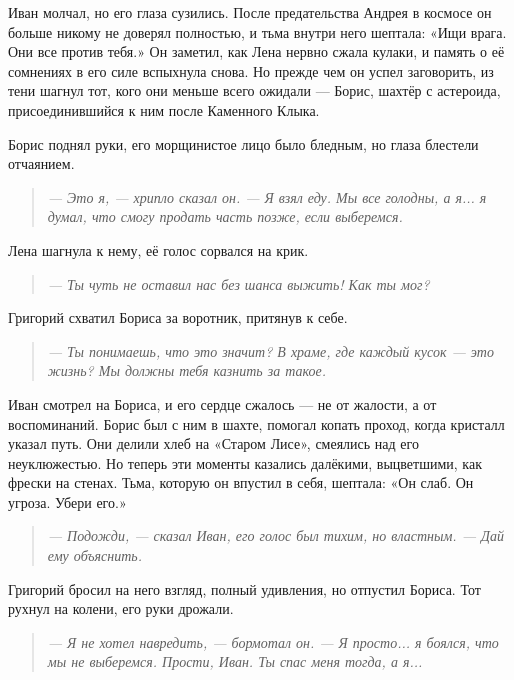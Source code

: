 \documentclass[12pt,a4paper]{book} %
\newenvironment{dialogue}{\begin{quote}\itshape}{\end{quote}}
\begin{document}
Иван молчал, но его глаза сузились. После предательства Андрея в космосе он больше никому не доверял полностью, и тьма внутри него шептала: «Ищи врага. Они все против тебя.» Он заметил, как Лена нервно сжала кулаки, и память о её сомнениях в его силе вспыхнула снова. Но прежде чем он успел заговорить, из тени шагнул тот, кого они меньше всего ожидали --- Борис, шахтёр с астероида, присоединившийся к ним после Каменного Клыка.

Борис поднял руки, его морщинистое лицо было бледным, но глаза блестели отчаянием.

\begin{dialogue}
--- Это я, --- хрипло сказал он. --- Я взял еду. Мы все голодны, а я... я думал, что смогу продать часть позже, если выберемся.
\end{dialogue}

Лена шагнула к нему, её голос сорвался на крик.

\begin{dialogue}
--- Ты чуть не оставил нас без шанса выжить! Как ты мог?
\end{dialogue}

Григорий схватил Бориса за воротник, притянув к себе.

\begin{dialogue}
--- Ты понимаешь, что это значит? В храме, где каждый кусок --- это жизнь? Мы должны тебя казнить за такое.
\end{dialogue}

Иван смотрел на Бориса, и его сердце сжалось --- не от жалости, а от воспоминаний. Борис был с ним в шахте, помогал копать проход, когда кристалл указал путь. Они делили хлеб на «Старом Лисе», смеялись над его неуклюжестью. Но теперь эти моменты казались далёкими, выцветшими, как фрески на стенах. Тьма, которую он впустил в себя, шептала: «Он слаб. Он угроза. Убери его.»

\begin{dialogue}
--- Подожди, --- сказал Иван, его голос был тихим, но властным. --- Дай ему объяснить.
\end{dialogue}

Григорий бросил на него взгляд, полный удивления, но отпустил Бориса. Тот рухнул на колени, его руки дрожали.

\begin{dialogue}
--- Я не хотел навредить, --- бормотал он. --- Я просто... я боялся, что мы не выберемся. Прости, Иван. Ты спас меня тогда, а я...
\end{dialogue}
\end{document}
